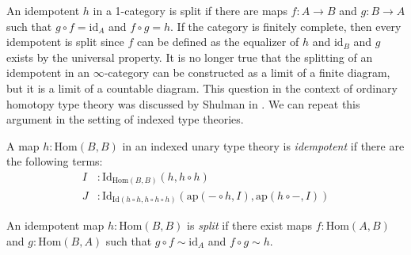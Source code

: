 \documentclass[reqno]{mscs}
\newcommand{\fs}[1]{\mathrm{#1}}
\newcommand{\Hom}{\fs{Hom}}
\newcommand{\Id}{\fs{Id}}
\newcommand{\id}{\fs{id}}
\newcommand{\pmap}{\fs{ap}}
\numberwithin{figure}{section}
\begin{document}
An idempotent $h$ in a 1-category is split if there are maps $f : A \to B$ and $g : B \to A$ such that $g \circ f = \id_A$ and $f \circ g = h$.
If the category is finitely complete, then every idempotent is split since $f$ can be defined as the equalizer of $h$ and $\id_B$ and $g$ exists by the universal property.
It is no longer true that the splitting of an idempotent in an $\infty$-category can be constructed as a limit of a finite diagram, but it is a limit of a countable diagram.
This question in the context of ordinary homotopy type theory was discussed by Shulman in \cite{split-idemp}.
We can repeat this argument in the setting of indexed type theories.

\begin{defn}
A map $h : \Hom(B,B)$ in an indexed unary type theory is \emph{idempotent} if there are the following terms:
\begin{align*}
I & : \Id_{\Hom(B,B)}(h, h \circ h) \\
J & : \Id_{\Id(h \circ h, h \circ h \circ h)}(\pmap(- \circ h, I), \pmap(h \circ -, I))
\end{align*}
\end{defn}

\begin{defn}
An idempotent map $h : \Hom(B,B)$ is \emph{split} if there exist maps $f : \Hom(A,B)$ and $g : \Hom(B,A)$ such that $g \circ f \sim \id_A$ and $f \circ g \sim h$.
\end{defn}
\end{document}
